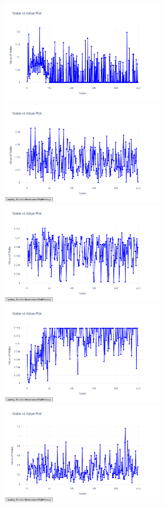 \documentclass{article}
\begin{document}
\begin{figure}[H]
    \centering
    \includegraphics[width=7cm]{noise_conservation_d_i}
    \includegraphics[width=7cm]{noise_Newtons_First_Law_d_i}
    \includegraphics[width=7cm]{noise_Newtons_Second_Law_d_i}
    \includegraphics[width=7cm]{noise_Newtons_Third_Law_d_i}
    \includegraphics[width=7cm]{noise_Rutherford_d_i}

\end{figure}
\end{document}
